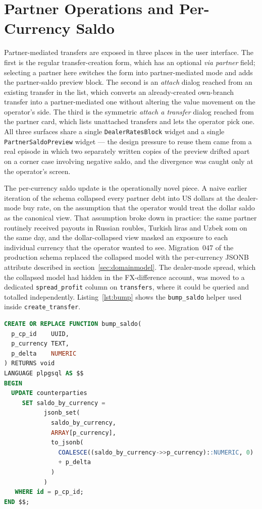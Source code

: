 \section{Partner Operations and Per-Currency Saldo}
\label{sec:partner}

Partner-mediated transfers are exposed in three places in the user interface. The first is the regular transfer-creation form, which has an optional \emph{via partner} field; selecting a partner here switches the form into partner-mediated mode and adds the partner-saldo preview block. The second is an \emph{attach} dialog reached from an existing transfer in the list, which converts an already-created own-branch transfer into a partner-mediated one without altering the value movement on the operator's side. The third is the symmetric \emph{attach a transfer} dialog reached from the partner card, which lists unattached transfers and lets the operator pick one. All three surfaces share a single \texttt{DealerRatesBlock} widget and a single \texttt{PartnerSaldoPreview} widget --- the design pressure to reuse them came from a real episode in which two separately written copies of the preview drifted apart on a corner case involving negative saldo, and the divergence was caught only at the operator's screen.

The per-currency saldo update is the operationally novel piece. A naive earlier iteration of the schema collapsed every partner debt into US dollars at the dealer-mode buy rate, on the assumption that the operator would treat the dollar saldo as the canonical view. That assumption broke down in practice: the same partner routinely received payouts in Russian roubles, Turkish liras and Uzbek som on the same day, and the dollar-collapsed view masked an exposure to each individual currency that the operator wanted to see. Migration~047 of the production schema replaced the collapsed model with the per-currency JSONB attribute described in section~\ref{sec:domainmodel}. The dealer-mode spread, which the collapsed model had hidden in the FX-difference account, was moved to a dedicated \texttt{spread\_profit} column on \texttt{transfers}, where it could be queried and totalled independently. Listing~\ref{lst:bump} shows the \texttt{bump\_saldo} helper used inside \texttt{create\_transfer}.

\begin{lstlisting}[language=SQL,caption={Per-currency saldo update (PL/pgSQL)},label={lst:bump}]
CREATE OR REPLACE FUNCTION bump_saldo(
  p_cp_id    UUID,
  p_currency TEXT,
  p_delta    NUMERIC
) RETURNS void
LANGUAGE plpgsql AS $$
BEGIN
  UPDATE counterparties
     SET saldo_by_currency =
           jsonb_set(
             saldo_by_currency,
             ARRAY[p_currency],
             to_jsonb(
               COALESCE((saldo_by_currency->>p_currency)::NUMERIC, 0)
               + p_delta
             )
           )
   WHERE id = p_cp_id;
END $$;
\end{lstlisting}

